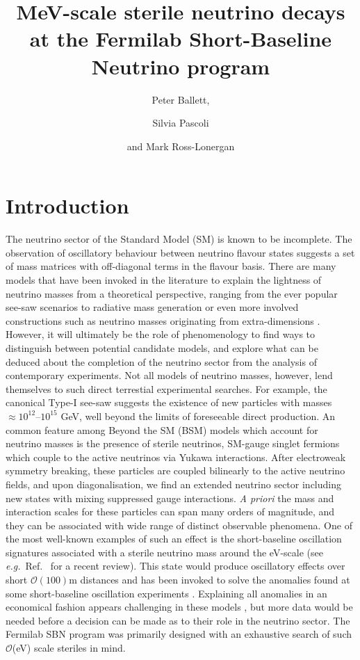 \documentclass[11pt, a4paper]{article}
\title{MeV-scale sterile neutrino decays at the Fermilab Short-Baseline Neutrino program}
\author{Peter Ballett,}
\author{Silvia Pascoli}
\author{and Mark Ross-Lonergan}
\affiliation{Institute for Particle Physics Phenomenology, Department of
Physics, Durham University, South Road, Durham DH1 3LE, United Kingdom}
\newcommand{\refref}[1]{Ref.~\cite{#1}}
\def\eg{\emph{e.g.}}
\begin{document}
 

\maketitle

\section{Introduction}

The neutrino sector of the Standard Model (SM) is known to be incomplete. The
observation of oscillatory behaviour between neutrino flavour states
\cite{Fukuda:1998mi} suggests a set of mass matrices with off-diagonal terms in
the flavour basis. There are many models that have been invoked in the
literature to explain the lightness of neutrino masses from a theoretical
perspective, ranging from the ever popular see-saw scenarios
\cite{Minkowski:1977sc, GellMann:1980vs, Mohapatra:1979ia} to radiative mass
generation \cite{Zee:1980ai,Babu:1988ki} or even more involved constructions
such as neutrino masses originating from extra-dimensions
\cite{ArkaniHamed:1998vp}.  However, it will ultimately be the role of
phenomenology to find ways to distinguish between potential candidate models,
and explore what can be deduced about the completion of the neutrino sector
from the analysis of contemporary experiments.
%
Not all models of neutrino masses, however, lend themselves to such direct
terrestial experimental searches. For example, the canonical Type-I see-saw
\cite{Minkowski:1977sc, GellMann:1980vs, Mohapatra:1979ia} suggests the
existence of new particles with masses  $\approx 10^{12}$--$10^{15}$ GeV, well
beyond the limits of foreseeable direct production. An common feature among
Beyond the SM (BSM) models which account for neutrino masses is the presence of
sterile neutrinos, SM-gauge singlet fermions which couple to the active
neutrinos via Yukawa interactions. After electroweak symmetry breaking, these
particles are coupled bilinearly to the active neutrino fields, and upon
diagonalisation, we find an extended neutrino sector including new states with
mixing suppressed gauge interactions. \emph{A priori} the mass and interaction
scales for these particles can span many orders of magnitude, and they can be
associated with wide range of distinct observable phenomena. 
%
One of the most well-known examples of such an effect is the short-baseline
oscillation signatures associated with a sterile neutrino mass around the
eV-scale (see \eg\ \refref{Gariazzo:2015rra} for a recent review). This state
would produce oscillatory effects over short $\mathcal{O}(100)$m distances and
has been invoked to solve the anomalies found at some short-baseline
oscillation experiments
\cite{Aguilar:2001ty,Aguilar-Arevalo:2013pmq,AguilarArevalo:2008rc}.
Explaining all anomalies in an economical fashion appears challenging in these
models \cite{Kopp:2013vaa,Conrad:2012qt}, but more data would be needed before
a decision can be made as to their role in the neutrino sector. The Fermilab
SBN \cite{Antonello:2015lea} program was primarily designed with an exhaustive
search of such $\mathcal{O}$(eV) scale steriles in mind.
\end{document}
